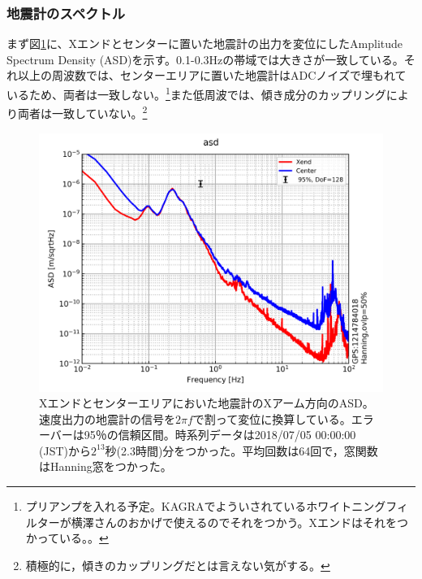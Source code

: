 \subsubsection{地震計のスペクトル}
まず図\ref{img:img1}に、Xエンドとセンターに置いた地震計の出力を変位にしたAmplitude Spectrum Density (ASD)を示す。0.1-0.3Hzの帯域では大きさが一致している。それ以上の周波数では、センターエリアに置いた地震計はADCノイズで埋もれているため、両者は一致しない。\footnote[6]{プリアンプを入れる予定。KAGRAでよういされているホワイトニングフィルターが横澤さんのおかげで使えるのでそれをつかう。Xエンドはそれをつかっている。。}また低周波では、傾き成分のカップリングにより両者は一致していない。\footnote[7]{積極的に，傾きのカップリングだとは言えない気がする。}

\begin{figure}[H]
  \begin{center}
    \includegraphics[width=11.5cm]{./asd.png}
  \end{center}
  \caption{Xエンドとセンターエリアにおいた地震計のXアーム方向のASD。速度出力の地震計の信号を$2\pi{f}$で割って変位に換算している。エラーバーは95％の信頼区間。時系列データは2018/07/05 00:00:00 (JST)から$2^{13}$秒(2.3時間)分をつかった。平均回数は64回で，窓関数はHanning窓をつかった。}\label{img:img1}
\end{figure}


